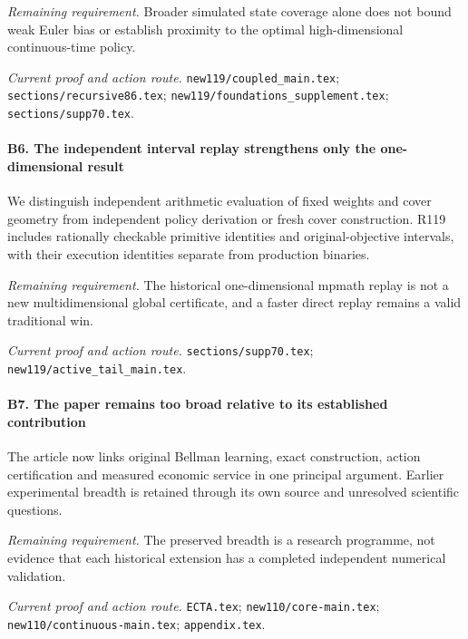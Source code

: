 \par\emph{Remaining requirement.} Broader simulated state coverage alone does not bound weak Euler bias or establish proximity to the optimal high-dimensional continuous-time policy.

\par\emph{Current proof and action route.} \nolinkurl{new119/coupled_main.tex}; \nolinkurl{sections/recursive86.tex}; \nolinkurl{new119/foundations_supplement.tex}; \nolinkurl{sections/supp70.tex}.

\paragraph{B6. The independent interval replay strengthens only the one-dimensional result}

We distinguish independent arithmetic evaluation of fixed weights and cover geometry from independent policy derivation or fresh cover construction. R119 includes rationally checkable primitive identities and original-objective intervals, with their execution identities separate from production binaries.

\par\emph{Remaining requirement.} The historical one-dimensional mpmath replay is not a new multidimensional global certificate, and a faster direct replay remains a valid traditional win.

\par\emph{Current proof and action route.} \nolinkurl{sections/supp70.tex}; \nolinkurl{new119/active_tail_main.tex}.

\paragraph{B7. The paper remains too broad relative to its established contribution}

The article now links original Bellman learning, exact construction, action certification and measured economic service in one principal argument. Earlier experimental breadth is retained through its own source and unresolved scientific questions.

\par\emph{Remaining requirement.} The preserved breadth is a research programme, not evidence that each historical extension has a completed independent numerical validation.

\par\emph{Current proof and action route.} \nolinkurl{ECTA.tex}; \nolinkurl{new110/core-main.tex}; \nolinkurl{new110/continuous-main.tex}; \nolinkurl{appendix.tex}.


